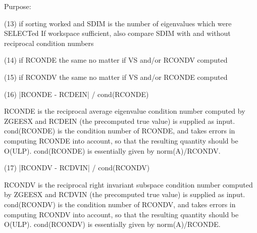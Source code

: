 \begin{DoxyParagraph}{Purpose\+: }
\begin{DoxyVerb}
    (13)    if sorting worked and SDIM is the number of
            eigenvalues which were SELECTed
            If workspace sufficient, also compare SDIM with and
            without reciprocal condition numbers

    (14)    if RCONDE the same no matter if VS and/or RCONDV computed

    (15)    if RCONDV the same no matter if VS and/or RCONDE computed

    (16)  |RCONDE - RCDEIN| / cond(RCONDE)

       RCONDE is the reciprocal average eigenvalue condition number
       computed by ZGEESX and RCDEIN (the precomputed true value)
       is supplied as input.  cond(RCONDE) is the condition number
       of RCONDE, and takes errors in computing RCONDE into account,
       so that the resulting quantity should be O(ULP). cond(RCONDE)
       is essentially given by norm(A)/RCONDV.

    (17)  |RCONDV - RCDVIN| / cond(RCONDV)

       RCONDV is the reciprocal right invariant subspace condition
       number computed by ZGEESX and RCDVIN (the precomputed true
       value) is supplied as input. cond(RCONDV) is the condition
       number of RCONDV, and takes errors in computing RCONDV into
       account, so that the resulting quantity should be O(ULP).
       cond(RCONDV) is essentially given by norm(A)/RCONDE.\end{DoxyVerb}
 
\end{DoxyParagraph}

